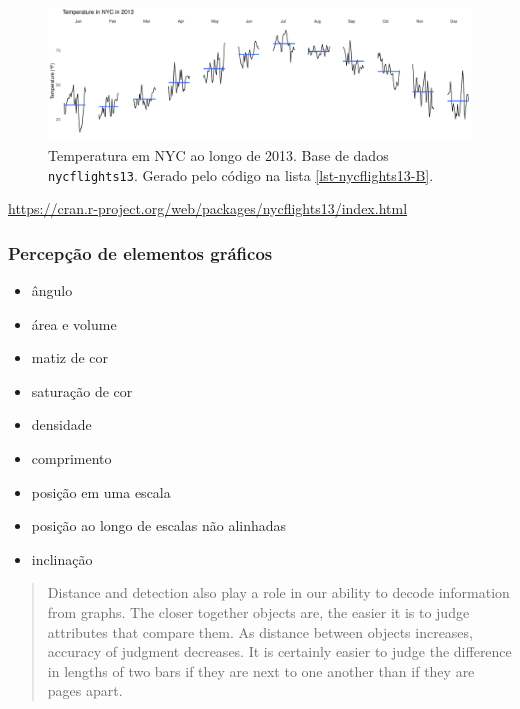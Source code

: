 \begin{frame}
\begin{figure}[h]
 \centering
  \includegraphics[width=\textwidth,height=0.7\textheight,keepaspectratio]{figures/nycflights13-B.pdf}
 \caption{Temperatura em NYC ao longo de 2013. Base de dados \texttt{nycflights13}. Gerado pelo código na lista \ref{lst-nycflights13-B}.}
 \label{fig-nycflights13-B}
\end{figure}

\url{https://cran.r-project.org/web/packages/nycflights13/index.html}

\end{frame}






\begin{frame}[allowframebreaks]
\frametitle{Percepção de elementos gráficos}
\begin{itemize}
\item ângulo  
\item área e volume 
\item matiz de cor
\item saturação de cor
\item densidade
\item comprimento
\item posição em uma escala
\item posição ao longo de escalas não alinhadas
\item inclinação
\end{itemize}

\begin{quote}
Distance and detection also play a role in our ability to decode
information from graphs. The closer together objects are, the
easier it is to judge attributes that compare them. As distance
between objects increases, accuracy of judgment decreases. It
is certainly easier to judge the difference in lengths of two bars
if they are next to one another than if they are pages apart.
\cite{robbins_creating_2013}
\end{quote}

\end{frame}



